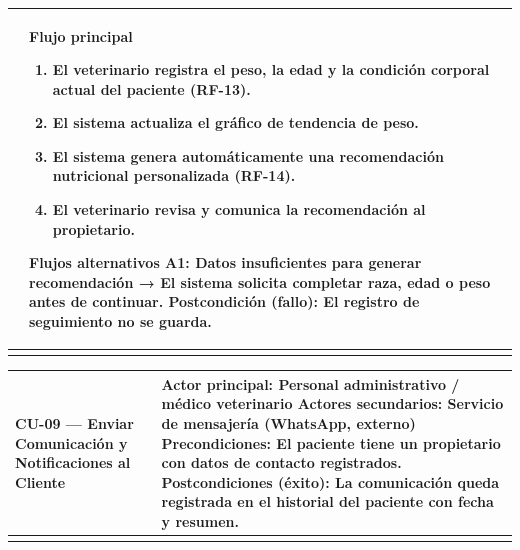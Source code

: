 \documentclass[
]{article}
\newcounter{none} %
\begin{document}
{\def\LTcaptype{none} %
\begin{longtable}[]{@{}
  >{\raggedright\arraybackslash}p{}
  >{\raggedright\arraybackslash}p{}@{}}
\toprule\noalign{}
\begin{minipage}[b]{\linewidth}\raggedright
\end{minipage} & \begin{minipage}[b]{\linewidth}\raggedright
\textbf{Flujo principal}

\begin{enumerate}
\def\labelenumi{\arabic{enumi}.}
\item
  El veterinario registra el peso, la edad y la condición corporal
  actual del paciente (RF-13).
\item
  El sistema actualiza el gráfico de tendencia de peso.
\item
  El sistema genera automáticamente una recomendación nutricional
  personalizada (RF-14).
\item
  El veterinario revisa y comunica la recomendación al propietario.
\end{enumerate}

\textbf{Flujos alternativos} A1: Datos insuficientes para generar recomendación → El sistema solicita
completar raza, edad o peso antes de continuar. \textbf{Postcondición (fallo):} El registro de seguimiento no se guarda.
\end{minipage} \\
\midrule\noalign{}
\endhead
\bottomrule\noalign{}
\endlastfoot
\end{longtable}
}

{\def\LTcaptype{none} %
\begin{longtable}[]{@{}
  >{\raggedright\arraybackslash}p{}
  >{\raggedright\arraybackslash}p{}@{}}
\toprule\noalign{}
\begin{minipage}[b]{\linewidth}\raggedright
CU-09 --- Enviar Comunicación y Notificaciones al Cliente
\end{minipage} & \begin{minipage}[b]{\linewidth}\raggedright
\textbf{Actor principal:} Personal administrativo / médico veterinario
\textbf{Actores secundarios:} Servicio de mensajería (WhatsApp, externo)
\textbf{Precondiciones:} El paciente tiene un propietario con datos de
contacto registrados. \textbf{Postcondiciones (éxito):} La comunicación queda registrada en el
historial del paciente con fecha y resumen.
\end{minipage} \\
\midrule\noalign{}
\endhead
\bottomrule\noalign{}
\endlastfoot
\end{longtable}
}
\end{document}
